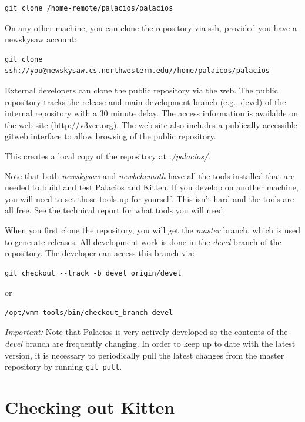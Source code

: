 \documentclass[11pt]{article}
\begin{document}
\begin{verbatim}
git clone /home-remote/palacios/palacios
\end{verbatim}


On any other machine, you can clone the repository via ssh, provided
you have a newskysaw account:
 
\begin{verbatim}
git clone ssh://you@newskysaw.cs.northwestern.edu//home/palaicos/palacios
\end{verbatim}

External developers can clone the public repository via the web.  The
public repository tracks the release and main development branch
(e.g., devel) of the internal repository with a 30 minute delay.  The
access information is available on the web site (http://v3vee.org).
The web site also includes a publically accessible gitweb interface to
allow browsing of the public repository.

This creates a local copy of the repository at {\em ./palacios/}.

Note that both {\em newskysaw} and {\em newbehemoth} have all the
tools installed that are needed to build and test Palacios and Kitten.
If you develop on another machine, you will need to set those tools up
for yourself.  This isn't hard and the tools are all free.  See the
technical report for what tools you will need.

When you first clone the repository, you will get the {\em master}
branch, which is used to generate releases.   All development work is
done in the {\em devel} branch of the repository. The developer can
access this branch via:

\begin{verbatim}
git checkout --track -b devel origin/devel
\end{verbatim}

or 

\begin{verbatim}
/opt/vmm-tools/bin/checkout_branch devel
\end{verbatim}

{\em Important:}
Note that Palacios is very actively developed so the contents of the
{\em devel} branch are frequently changing. In order to keep up to
date with the latest version, it is necessary to periodically pull the
latest changes from the master repository by running \verb.git pull..



\section{Checking out Kitten}
\end{document}
